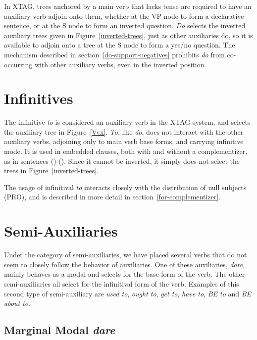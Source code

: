 In XTAG, trees anchored by a main verb that lacks tense are required to have an
auxiliary verb adjoin onto them, whether at the VP node to form a declarative
sentence, or at the S node to form an inverted question.  {\it Do} selects the
inverted auxiliary trees given in Figure~\ref{inverted-trees}, just as other
auxiliaries do, so it is available to adjoin onto a tree at the S node to form
a yes/no question.  The mechanism described in
section~\ref{do-support-negatives} prohibits {\it do} from co-occurring with
other auxiliary verbs, even in the inverted position.


\section{Infinitives}

The infinitive {\it to} is considered an auxiliary verb in the XTAG system, and
selects the auxiliary tree in Figure~\ref{Vvx}.  {\it To}, like {\it do}, does
not interact with the other auxiliary verbs, adjoining only to main verb base
forms, and carrying infinitive mode.  It is used in embedded clauses, both with
and without a complementizer, as in sentences ()-().  Since it
cannot be inverted, it simply does not select the trees in
Figure~\ref{inverted-trees}.


The usage of infinitival {\em to} interacts closely with the distribution of
null subjects (PRO), and is described in more detail in
section~\ref{for-complementizer}.

\section{Semi-Auxiliaries}

Under the category of semi-auxiliaries, we have placed several verbs that do
not seem to closely follow the behavior of auxiliaries.  One of these 
auxiliaries, {\it dare}, mainly behaves as a modal and selects for the base 
form of the verb.  The other semi-auxiliaries all select for the infinitival 
form of the verb.  Examples of this second type of semi-auxiliary are {\it 
used to}, {\it ought to}, {\it get to}, {\it have to}, {\it BE to} and {\it
BE about to}.  

\subsection{Marginal Modal {\it dare}}

